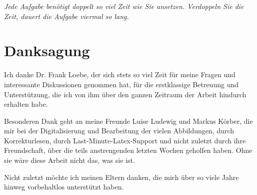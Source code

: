 
\begin{flushright}{\slshape
    Jede Aufgabe benötigt doppelt so viel Zeit wie Sie ansetzen. Verdoppeln Sie die Zeit, dauert die Aufgabe viermal so lang. }%
\end{flushright}



\bigskip

\begingroup
\let\clearpage\relax
\let\cleardoublepage\relax
\let\cleardoublepage\relax
\chapter*{Danksagung}

Ich danke Dr. Frank Loebe, der sich stets so viel Zeit für meine Fragen und interessante Diskussionen genommen hat, für die erstklassige Betreuung und Unterstützung, die ich von ihm über den ganzen Zeitraum der Arbeit hindurch erhalten habe.

Besonderen Dank geht an meine Freunde Luise Ludewig und Markus Körber, die mir bei der Digitalisierung und Bearbeitung der vielen Abbildungen, durch Korrekturlesen, durch Last-Minute-Latex-Support und nicht zuletzt durch ihre Freundschaft, über die teils anstrengenden letzten Wochen geholfen haben. 
Ohne sie wäre diese Arbeit nicht das, was sie ist.

Nicht zuletzt möchte ich meinen Eltern danken, die mich über so viele Jahre hinweg vorbehaltlos unterstützt haben.


\endgroup
